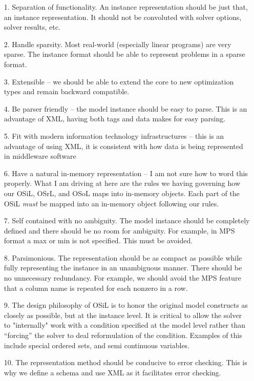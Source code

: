 \label{section:constitution}

\begin{itemize}


\item[1.]  Separation of functionality. An instance representation should be just that, an instance representation. It should not be convoluted with solver options, solver results, etc.

\item[2.]  Handle sparsity.  Most real-world (especially linear programs) are very sparse.  The instance format should be able to represent problems in a sparse format. 

\item[3.]  Extensible  -- we should be able to extend the core to new optimization types and remain backward compatible. 

\item[4.] Be parser friendly -- the model instance should be easy to parse. This is an advantage of XML, having both tags and data makes for easy parsing. 

\item[5.]   Fit with modern information technology infrastructures -- this is an advantage of using XML, it is consistent with how data is being represented  in middleware software

\item[6.] Have a natural in-memory representation  -- I am not sure how to word this properly. What I am driving at here  are the rules we  having governing how our OSiL, OSrL, and OSoL maps into in-memory objects. Each part of the OSiL  {\it must} be mapped into an in-memory object following our rules. 


\item[7.]  Self contained with no ambiguity.  The model instance should be completely defined and there should  be no room for ambiguity. For example, in MPS format a max or min is not specified. This must be  avoided. 

\item[8.]  Parsimonious. The representation should be as compact as possible while fully representing the instance in an unambiguous manner.  There should be no unnecessary redundancy. For example, we should avoid the MPS feature that a column name is repeated for each nonzero in a row.

\item[9.]  The design philosophy of OSiL is to honor the original model constructs as closely as possible, but at the instance level.  It is critical to  allow the solver to "internally"  work with a  condition specified at the model level  rather than ``forcing'' the solver to  deal reformulation of the condition. Examples of this include special ordered sets, and semi continuous variables.  

\item[10.] The representation method should be conducive to error checking. This is why we define a schema and use XML as it facilitates error checking. 



\end{itemize}

